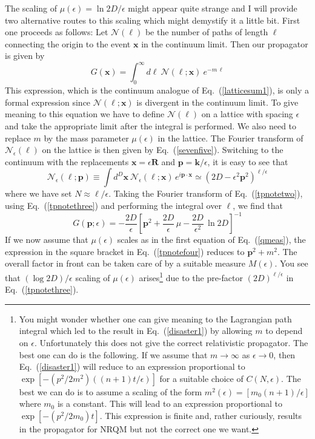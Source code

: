 \documentclass[12pt]{article}
\def\eq#1{{Eq.~(\ref{#1})}}
\begin{document}
The scaling of $\mu(\epsilon)=\ln 2D/\epsilon$ might appear quite strange and I will provide two alternative routes to this scaling which might demystify it a little bit. First one proceeds as follows:  Let $\mathcal{N}(\ell)$ be the number of paths of length $\ell$ connecting the origin to the event $\mathbf{x}$ in the continuum limit. Then our propagator is given by
\begin{equation}
 G(\mathbf{x}) = \int_0^\infty d\ell\ \mathcal{N}(\ell; \mathbf{x})\ e^{-m\, \ell}
 \label{tpnotetwo}
\end{equation}
This expression, which is the continuum analogue of \eq{latticesum1}, is only a formal expression since $\mathcal{N}(\ell; \mathbf{x})$ is divergent in the continuum limit. 
To give meaning to this equation we have to define $\mathcal{N}(\ell)$ on a lattice with spacing $\epsilon$ and take the appropriate limit after the integral is performed. We also need to replace $m$ by the mass parameter $\mu(\epsilon)$ in the lattice. The Fourier transform of 
$\mathcal{N}_\epsilon(\ell)$ on the lattice is then given by \eq{sevenfive}. 
Switching to the continuum with the replacements $\mathbf{x} = \epsilon \mathbf{R}$ and $\mathbf{p} = \mathbf{k}/\epsilon$, it is easy to see that
\begin{equation}
\mathcal{N}_\epsilon(\ell; \mathbf{p}) \equiv \int d^D\mathbf{x}\ \mathcal{N}_\epsilon(\ell; \mathbf{x}) \, e^{i\mathbf{p\cdot x}} \simeq (2D - \epsilon^2 \mathbf{p}^2)^{\ell/\epsilon}
 \label{tpnotethree}
\end{equation} 
where we have set $N\approx \ell/\epsilon$. Taking the Fourier transform of \eq{tpnotetwo},  using \eq{tpnotethree} and performing the integral over $\ell$, we find that
\begin{equation}
 G(\mathbf{p}; \epsilon) = -\frac{2D}{\epsilon} \left[ \mathbf{p}^2 + \frac{2D}{\epsilon} \, \mu -  \frac{2D}{\epsilon^2} \, \ln 2D\right]^{-1}
 \label{tpnotefour}
\end{equation} 
If we now assume that $\mu(\epsilon)$ scales as in the first equation of \eq{qmeas}, the expression in the square bracket in \eq{tpnotefour} reduces to $\mathbf{p}^2 + m^2$. The overall factor in front can be taken care of by a suitable measure $M(\epsilon)$. You see that $(\log 2D)/\epsilon$ scaling of $\mu(\epsilon)$ arises\footnote{You might wonder whether one can give meaning to the Lagrangian path integral which led to the result in \eq{disaster1} by allowing $m$ to depend on $\epsilon$. Unfortunately this does not give the correct relativistic propagator. The best one can do is the following. If we  assume that $m\to\infty$ as $\epsilon\to0$, then \eq{disaster1} will reduce  to an expression proportional to 
$
\exp[-(p^2/2m^2)((n+1)t/\epsilon)]$
for a suitable choice of $C(N,\epsilon)$. The best we can do is to assume a scaling of the form 
$
m^2(\epsilon) = [m_0(n+1)/\epsilon]
$ 
where $m_0$ is a constant. This will lead to an expression proportional to 
$\exp[-(p^2/2m_0)t]$.
This expression is finite and, rather curiously, results in the propagator for NRQM but not the correct one we want.} due to the pre-factor $(2D)^{\ell/\epsilon}$ in \eq{tpnotethree}.
\end{document}
